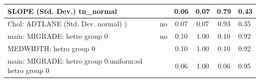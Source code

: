 \begin{table}
\begin{center}
\begin{tabular}{|l|l|c|c|c|l|}
			\hline
			SLOPE (Std. Dev.) tn_normal &  & 0.06 & 0.07 & 0.79 & 0.43 \\
			\hline
			 Chol: ADTLANE (Std. Dev. normal) ) & no & 0.07 & 0.07 & 0.93 & 0.35 \\
			\hline
			main: MIGRADE: hetro group 0 & no & 0.10 & 1.00 & 0.10 & 0.92 \\
			\hline
			MEDWIDTH: hetro group 0 &  & 0.10 & 1.00 & 0.10 & 0.92 \\
			\hline
			main: MIGRADE: hetro group 0:uniform:sd  hetro group 0 &  & 0.06 & 1.00 & 0.06 & 0.95 \\
			\hline
		\end{tabular}
	\end{center}
\end{table}